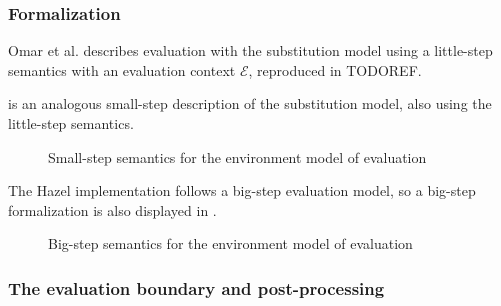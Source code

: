 
\subsubsection{Formalization}
\label{sec:formalization}

Omar et al. \cite{conf/popl/HazelnutLive19} describes evaluation with the substitution model using a little-step semantics with an evaluation context $\mathcal{E}$, reproduced in TODOREF.


 is an analogous small-step description of the substitution model, also using the little-step semantics.

\begin{figure}
  \centering
  \begin{mdframed}
    \begin{singlespace}
      
    \end{singlespace}
  \end{mdframed}
  \caption{Small-step semantics for the environment model of evaluation}
  \label{fig:small-step-formal}
\end{figure}

The Hazel implementation follows a big-step evaluation model, so a big-step formalization is also displayed in .

\begin{figure}
  \centering
  \begin{mdframed}
    \begin{singlespace}
      
    \end{singlespace}
  \end{mdframed}
  \caption{Big-step semantics for the environment model of evaluation}
  \label{fig:big-step-formal}
\end{figure}




\subsubsection{The evaluation boundary and post-processing}
\label{sec:closures_to_lambdas}

